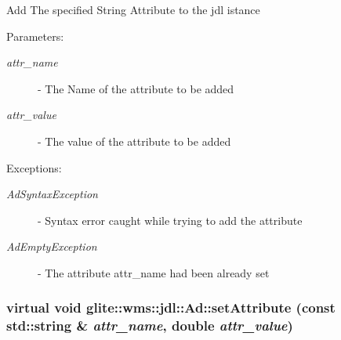 Add The specified String Attribute to the jdl istance \begin{Desc}
\item[Parameters:]
\begin{description}
\item[{\em attr\_\-name}]- The Name of the attribute to be added \item[{\em attr\_\-value}]- The value of the attribute to be added \end{description}
\end{Desc}
\begin{Desc}
\item[Exceptions:]
\begin{description}
\item[{\em Ad\-Syntax\-Exception}]- Syntax error caught while trying to add the attribute \item[{\em Ad\-Empty\-Exception}]- The attribute attr\_\-name had been already set \end{description}
\end{Desc}
\hypertarget{classglite_1_1wms_1_1jdl_1_1Ad_z19_12}{
\subsubsection[setAttribute]{\setlength{\rightskip}{0pt plus 5cm}virtual void glite::wms::jdl::Ad::set\-Attribute (const std::string \& {\em attr\_\-name}, double {\em attr\_\-value})}}
\label{classglite_1_1wms_1_1jdl_1_1Ad_z19_12}


